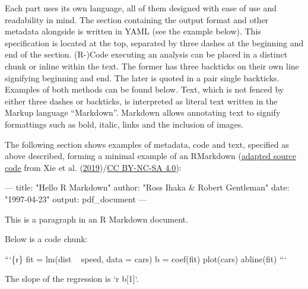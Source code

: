 \documentclass[12pt,a4paper,]{article}
\newenvironment{Shaded}{\begin{snugshade}}{\end{snugshade}}
\newcommand{\AttributeTok}[1]{\textcolor[rgb]{0.77,0.63,0.00}{#1}}
\newcommand{\BaseNTok}[1]{\textcolor[rgb]{0.00,0.00,0.81}{#1}}
\newcommand{\FunctionTok}[1]{\textcolor[rgb]{0.00,0.00,0.00}{#1}}
\newcommand{\NormalTok}[1]{#1}
\newcommand{\OtherTok}[1]{\textcolor[rgb]{0.56,0.35,0.01}{#1}}
\newcommand{\StringTok}[1]{\textcolor[rgb]{0.31,0.60,0.02}{#1}}
\begin{document}
Each part uses its own language, all of them designed with ease of use and readability in mind.
The section containing the output format and other metadata alongside is written in YAML (see the example below).
This specification is located at the top, separated by three dashes at the beginning and end of the section.
(R-)Code executing an analysis can be placed in a distinct chunk or inline within the text.
The former has three backticks on their own line signifying beginning and end.
The later is quoted in a pair single backticks.
Examples of both methods can be found below.
Text, which is not fenced by either three dashes or backticks, is interpreted as literal text written in the Markup language ``Markdown''.
Markdown allows annotating text to signify formattings such as bold, italic, links and the inclusion of images.

The following section shows examples of metadata, code and text, specified as above described, forming a minimal example of an RMarkdown (\href{https://github.com/rstudio/rmarkdown-book/blob/a10b33d47a2b223a8ef643c245d45e4dfc7091b8/02-basics.Rmd\#L15-L39}{adapted source code} from Xie et al. (\protect\hyperlink{ref-xieMarkdownDefinitiveGuide2019}{2019})/\href{https://creativecommons.org/licenses/by-nc-sa/4.0/}{CC BY-NC-SA 4.0}):

\begin{Shaded}
\begin{Highlighting}[]
\OtherTok{---}
\FunctionTok{title:}\AttributeTok{ }\StringTok{"Hello R Markdown"}
\FunctionTok{author:}\AttributeTok{ }\StringTok{"Ross Ihaka & Robert Gentleman"}
\FunctionTok{date:}\AttributeTok{ }\StringTok{"1997-04-23"}
\FunctionTok{output:}\AttributeTok{ pdf_document}
\OtherTok{---}
\end{Highlighting}
\end{Shaded}

\begin{Shaded}
\begin{Highlighting}[]
\NormalTok{This is a paragraph in an R Markdown document.}

\NormalTok{Below is a code chunk:}

\NormalTok{```\{r\}}
\NormalTok{fit = lm(dist ~ speed, data = cars)}
\NormalTok{b   = coef(fit)}
\NormalTok{plot(cars)}
\NormalTok{abline(fit)}
\NormalTok{```}

\NormalTok{The slope of the regression is }\BaseNTok{`r b[1]`}\NormalTok{.}
\end{Highlighting}
\end{Shaded}
\end{document}
